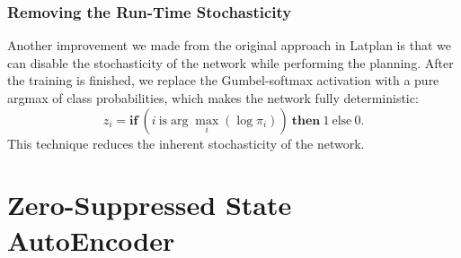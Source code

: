 \subsubsection{Removing the Run-Time Stochasticity}
\label{argmax}

Another improvement we made from the original approach in Latplan is that we can
disable the stochasticity of the network while performing the planning.
After the training is finished, we replace the Gumbel-softmax activation with
a pure argmax of class probabilities, which makes the network fully deterministic:
\[
 z_{i} = \textbf{if}\ (i\ \text{is} \arg \max_i (\log \pi_{i}))\ \textbf{then}\ 1\ \text{else}\ 0.
\]
% 
This technique reduces the inherent stochasticity of the network.

\section{Zero-Suppressed State AutoEncoder}
\label{zsae}


